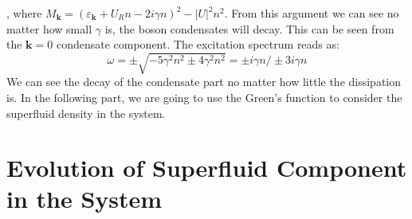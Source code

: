 \documentclass{article}
\newcommand{\tmmathbf}[1]{\ensuremath{\boldsymbol{#1}}}
\begin{document}
, where $M_{\tmmathbf{k}} = (\varepsilon_{\tmmathbf{k}} + U_R n - 2 i \gamma
n)^2 - | U |^2 n^2$. From this argument we can see no matter how small
$\gamma$ is, the boson condensates will decay. This can be seen from the
$\tmmathbf{k}= 0$ condensate component. The excitation spectrum reads as:
\begin{equation}
  \omega = \pm \sqrt{- 5 \gamma^2 n^2 \pm 4 \gamma^2 n^2} = \pm i \gamma n /
  \pm 3 i \gamma n
\end{equation}
We can see the decay of the condensate part no matter how little the
dissipation is. In the following part, we are going to use the Green's
function to consider the superfluid density in the system.

\section{Evolution of Superfluid Component in the System}
\end{document}
